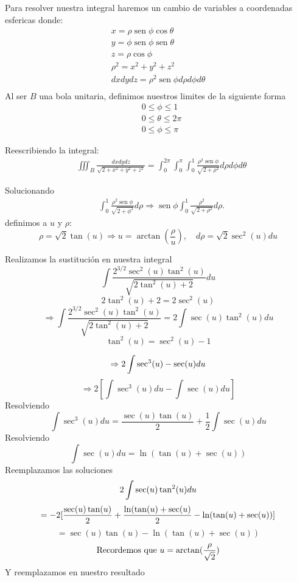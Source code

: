Para resolver nuestra integral haremos un cambio de variables a coordenadas esfericas donde:
$$
\begin{aligned}
 x=\rho \operatorname{sen} \phi \cos \theta\\
 y=\phi \operatorname{sen} \phi \operatorname{sen} \theta\\ 
 z=\rho \cos \phi \\
 \rho^2=x^2+y^2+z^2 \\
 dxdydz=\rho^2 \operatorname{sen} \phi d \rho d \phi d \theta \\
\end{aligned}
$$
Al ser $B$ una bola unitaria, definimos nuestros limites de la siguiente forma
$$
\begin{aligned}
& 0 \leq \phi \leq 1 \\
& 0 \leq \theta \leq 2 \pi \\
& 0 \leq \phi \leq \pi
\end{aligned}
$$

Reescribiendo la integral:
$$
\begin{aligned}
& \iiint_B \frac{d x d y d z}{\sqrt{2+x^2+y^2+z^2}}=\int_0^{2 \pi} \int_0^\pi \int_0^1 \frac{\rho^2 \operatorname{sen} \phi}{\sqrt{2+\rho^2}} d \rho d \phi d \theta
\end{aligned}
$$

Solucionando
$$
\begin{aligned}
& \int_0^1 \frac{\rho^2 \operatorname{sen} \phi}{\sqrt{2+\phi^2}} d \rho \Rightarrow \operatorname{sen} \phi \int_0^1 \frac{\rho^2}{\sqrt{2+\rho^2}} d \rho.
\end{aligned}
$$
definimos a $u$ y $\rho$:
$$
\rho=\sqrt{2} \tan (u) \Rightarrow u=\arctan \left(\frac{\rho}{u}\right), \quad d\rho=\sqrt{2} \sec ^2(u) d u
$$

Realizamos la sustitución en nuestra integral
$$
 \int \frac{2^{3 / 2} \sec ^2(u) \tan ^2(u)}{\sqrt{2 \tan ^2(u)+2}} d u
 $$
 $$
 2\tan^2(u)+2=2\sec^2(u)
 $$
 $$
 \Rightarrow  \int \frac{2^{3 / 2} \sec ^2(u) \tan ^2(u)}{\sqrt{2 \tan ^2(u)+2}}
 =2 \int \sec (u) \tan ^2(u) d u
 $$
 $$
 \tan ^2(u)=\sec ^2(u)-1
 $$
 
 $$
 \Rightarrow 2 \int \sec ^3(u)-\sec (u) d u\\
$$
$$
 \Rightarrow 2\left[\int \sec ^3(u) d u-\int \sec (u) d u\right]
$$
Resolviendo
$$
 \int \sec ^3(u) d u= \frac{\sec (u) \tan (u)}{2}+\frac{1}{2} \int \sec (u) d u
 $$
Resolviendo
$$
 \int \sec (u) d u=\ln (\tan (u)+\sec (u))
 $$
Reemplazamos las soluciones
$$
 2 \int {\sec (u) \tan ^2(u)} d u \\
 $$
 $$
 = -2[\frac{\sec(u)\tan(u)}{2}+\frac{\ln(\tan (u)+\sec(u)}{2}-\ln(\tan (u)+\sec (u))]\\
 $$
 $$
 = \sec (u) \tan (u)-\ln (\tan ( u)+\sec (u))
$$
$$
\text{Recordemos que }\\
u=\arctan(\frac{\rho}{\sqrt{2}})\\
$$
Y reemplazamos en nuestro resultado

